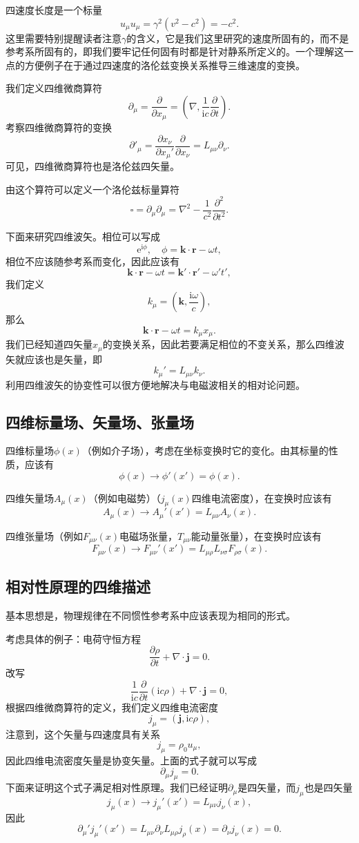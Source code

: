 \documentclass[UTF8]{ctexbook}
\newcommand{\e}{\mathrm{e}}
\renewcommand{\b}{\boldsymbol}
\renewcommand{\i}{\mathrm{i}}
\numberwithin{equation}{chapter}
\begin{document}
	四速度长度是一个标量
	\[u_\mu u_\mu=\gamma^2(v^2-c^2)=-c^2.\]
	这里需要特别提醒读者注意$\gamma$的含义，它是我们这里研究的速度所固有的，而不是参考系所固有的，即我们要牢记任何固有时都是针对静系所定义的。一个理解这一点的方便例子在于通过四速度的洛伦兹变换关系推导三维速度的变换。
	
	
	我们定义四维微商算符
	\[\partial_\mu=\frac{\partial}{\partial x_\mu}=\left(\nabla,\frac{1}{\i c}\frac{\partial }{\partial t}\right).\]
	考察四维微商算符的变换
	\[\partial'_{\mu}=\frac{\partial x_\nu}{\partial x_{\mu}'}\frac{\partial }{\partial x_\nu}=L_{\mu\nu}\partial_\nu.\]
	可见，四维微商算符也是洛伦兹四矢量。
	
	由这个算符可以定义一个洛伦兹标量算符
	\[\square=\partial_\mu\partial_\mu=\nabla^2-\frac{1}{c^2}\frac{\partial^2}{\partial t^2}.\]
	
	
	下面来研究四维波矢。相位可以写成
	\[\e^{\i\phi},\quad \phi=\b{k}\cdot\b{r}-\omega t,\]
	相位不应该随参考系而变化，因此应该有
	\[\b{k}\cdot\b{r}-\omega t=\b{k}'\cdot\b{r}'-\omega' t',\]
	我们定义
	\[k_\mu=\left(\b{k},\frac{\i\omega}{c}\right),\]
	那么
	\[\b{k}\cdot\b{r}-\omega t=k_\mu x_\mu.\]
	我们已经知道四矢量$x_\mu$的变换关系，因此若要满足相位的不变关系，那么四维波矢就应该也是矢量，即
	\[k_\mu'=L_{\mu\nu}k_\nu.\]
	利用四维波矢的协变性可以很方便地解决与电磁波相关的相对论问题。
	
	\subsection{四维标量场、矢量场、张量场}
	四维标量场$\phi(x)$（例如介子场），考虑在坐标变换时它的变化。由其标量的性质，应该有
	\[\phi(x)\rightarrow \phi'(x')=\phi(x).\]
	
	四维矢量场$A_\mu(x)$（例如电磁势）（$j_\mu(x)$四维电流密度），在变换时应该有
	\[A_\mu(x)\rightarrow A_\mu'(x')=L_{\mu\nu}A_\nu(x).\]
	
	四维张量场（例如$F_{\mu\nu}(x)$电磁场张量，$T_{\mu\nu}$能动量张量），在变换时应该有
	\[F_{\mu\nu}(x)\rightarrow F_{\mu\nu}'(x')=L_{\mu\rho}L_{\nu \sigma}F_{\rho\sigma}(x).\]
	
	\subsection{相对性原理的四维描述}
	基本思想是，物理规律在不同惯性参考系中应该表现为相同的形式。
	
	考虑具体的例子：电荷守恒方程
	\[\frac{\partial \rho}{\partial t}+\nabla\cdot\b{j}=0.\]
	改写
	\[\frac{1}{\i c }\frac{\partial }{\partial t}(\i c\rho)+\nabla\cdot\b{j}=0,\]
	根据四维微商算符的定义，我们定义四维电流密度
	\[j_\mu=\left(\b{j},\i c\rho\right),\]
	注意到，这个矢量与四速度具有关系
	\[j_\mu=\rho_0u_\mu,\]
	因此四维电流密度矢量是协变矢量。上面的式子就可以写成
	\[\partial_\mu j_\mu=0.\]
	下面来证明这个式子满足相对性原理。我们已经证明$\partial_\mu$是四矢量，而$j_\mu$也是四矢量
	\[j_\mu(x)\rightarrow j_\mu'(x')=L_{\mu\nu}j_\nu(x),\]
	因此
	\[\partial_{\mu}' j_\mu'(x')=L_{\mu\nu}\partial_\nu L_{\mu \rho}j_\rho(x)=\partial_\nu j_\nu(x)=0.\]
	
\end{document}
